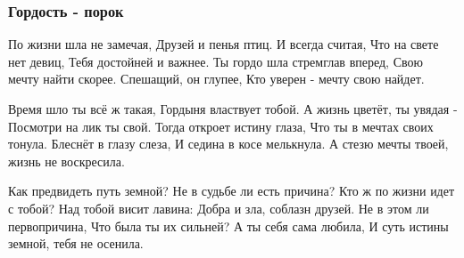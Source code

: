  
 
 

\subsubsection{Гордость - порок}

По жизни шла не замечая,
Друзей и пенья птиц.
И всегда считая,
Что на свете нет девиц,
Тебя достойней и важнее.
Ты гордо шла стремглав вперед,
Свою мечту найти скорее.
Спешащий, он глупее,
Кто уверен - мечту свою найдет.

Время шло ты всё ж такая,
Гордыня властвует тобой.
А жизнь цветёт, ты увядая -
Посмотри на лик ты свой.
Тогда откроет истину глаза,
Что ты в мечтах своих тонула.
Блеснёт в глазу слеза,
И седина в косе мелькнула.
А стезю мечты твоей, жизнь не воскресила.

Как предвидеть путь земной?
Не в судьбе ли есть причина?
Кто ж по жизни идет с тобой?
Над тобой висит лавина:
Добра и зла, соблазн друзей.
Не в этом ли первопричина,
Что была ты их сильней?
А ты себя сама любила,
И суть истины земной, тебя не осенила.
